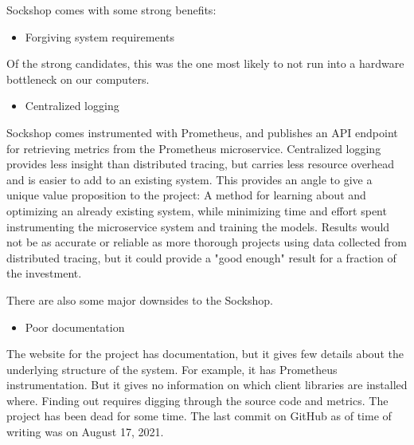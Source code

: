 Sockshop comes with some strong benefits:

\begin{itemize}
    \item Forgiving system requirements
\end{itemize}

Of the strong candidates, this was the one most likely to not run into a hardware bottleneck on our computers. 

\begin{itemize}
    \item Centralized logging
\end{itemize}
Sockshop comes instrumented with Prometheus, and publishes an API endpoint for retrieving metrics from the Prometheus microservice. Centralized logging provides less insight than distributed tracing, but carries less resource overhead and is easier to add to an existing system.
This provides an angle to give a unique value proposition to the project: A method for learning about and optimizing an already existing system, while minimizing time and effort spent instrumenting the microservice system and training the models. Results would not be as accurate or reliable as more thorough projects using data collected from distributed tracing, but it could provide a "good enough" result for a fraction of the investment.

There are also some major downsides to the Sockshop.

\begin{itemize}
    \item Poor documentation
\end{itemize}
The website for the project \cite*{Weaveworks} has documentation, but it gives few details about the underlying structure of the system. 
For example, it has Prometheus instrumentation. But it gives no information on which client libraries are installed where. Finding out requires digging through the source code and metrics.
The project has been dead for some time. The last commit on GitHub as of time of writing was on August 17, 2021. 